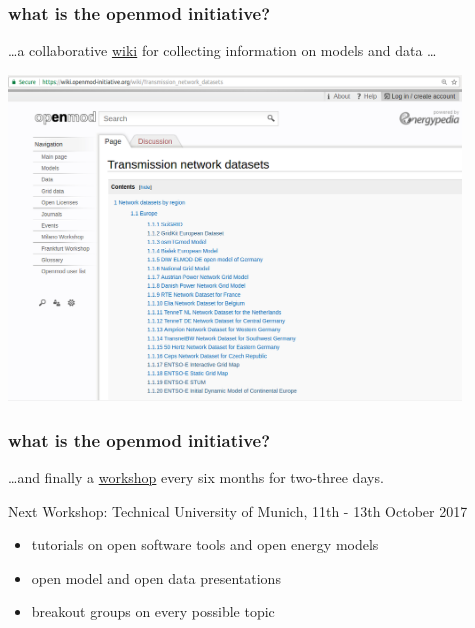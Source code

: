 \documentclass[12pt,aspectratio=169]{beamer}
\let\olditem\item
\renewcommand{\item}{%
\olditem\vspace{5pt}}
\begin{document}
\begin{frame}
  \frametitle{what is the openmod initiative?}

  \dots a collaborative \alert{\href{https://wiki.openmod-initiative.org/}{wiki}} for collecting information on models and data \dots

  \centering
  \includegraphics[width=12cm]{openmod-wiki}

\end{frame}

\begin{frame}
  \frametitle{what is the openmod initiative?}

  \dots and finally a \alert{\href{https://wiki.openmod-initiative.org/wiki/Open_Energy_Modelling_Workshop_-_Munich_2017}{workshop}} every six months for two-three days.

  \vspace{.5cm}

  Next Workshop: Technical University of Munich, 11th - 13th October 2017

  \begin{itemize}
  \item  tutorials on open software tools and open energy models
  \item open model and open data presentations
  \item breakout  groups on every possible topic
  \end{itemize}

\end{frame}
\end{document}
